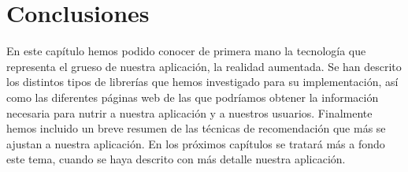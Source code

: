 \section{Conclusiones}
\label{makereference2.4}
En este capítulo hemos podido conocer de primera mano la tecnología que representa el grueso de nuestra aplicación, la realidad aumentada. Se han descrito 
los distintos tipos de librerías que hemos investigado para su implementación, así como las diferentes páginas web de las que podríamos obtener la información necesaria
para nutrir a nuestra aplicación y a nuestros usuarios. Finalmente hemos incluido un breve resumen de las técnicas de recomendación que más se ajustan a nuestra aplicación. En los próximos capítulos
se tratará más a fondo este tema, cuando se haya descrito con más detalle nuestra aplicación.

